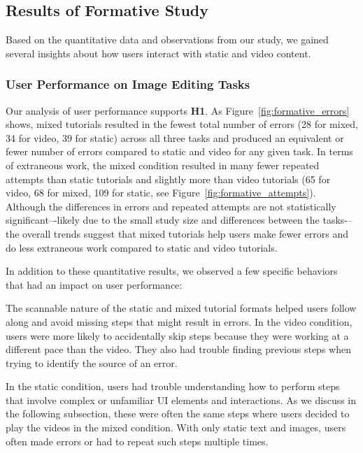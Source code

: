 \subsection{Results of Formative Study}

Based on the quantitative data and observations from our study, we gained several insights about how users interact with static and video content.

\subsubsection{User Performance on Image Editing Tasks}
Our analysis of user performance supports \textbf{H1}. As Figure~\ref{fig:formative_errors} shows, mixed tutorials resulted in the fewest total number of errors (28 for mixed, 34 for video, 39 for static) across all three tasks and produced an equivalent or fewer number of errors compared to static and video for any given task. In terms of extraneous work, the mixed condition resulted in many fewer repeated attempts than static tutorials and slightly more than video tutorials (65 for video, 68 for mixed, 109 for static, see Figure~\ref{fig:formative_attempts}). Although the differences in errors and repeated attempts are not statistically significant–-likely due to the small study size and differences between the tasks-–the overall trends suggest that mixed tutorials help users make fewer errors and do less extraneous work compared to static and video tutorials.

In addition to these quantitative results, we observed a few specific behaviors that had an impact on user performance:

The scannable nature of the static and mixed tutorial formats helped users follow along and avoid missing steps that might result in errors. In the video condition, users were more likely to accidentally skip steps because they were working at a different pace than the video. They also had trouble finding previous steps when trying to identify the source of an error.

In the static condition, users had trouble understanding how to perform steps that involve complex or unfamiliar UI elements and interactions. As we discuss in the following subsection, these were often the same steps where users decided to play the videos in the mixed condition. With only static text and images, users often made errors or had to repeat such steps multiple times.

